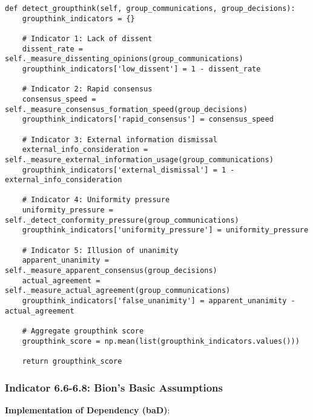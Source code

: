 \documentclass[11pt, onecolumn]{article}
\begin{document}
\begin{lstlisting}
def detect_groupthink(self, group_communications, group_decisions):
    groupthink_indicators = {}
    
    # Indicator 1: Lack of dissent
    dissent_rate = self._measure_dissenting_opinions(group_communications)
    groupthink_indicators['low_dissent'] = 1 - dissent_rate
    
    # Indicator 2: Rapid consensus
    consensus_speed = self._measure_consensus_formation_speed(group_decisions)
    groupthink_indicators['rapid_consensus'] = consensus_speed
    
    # Indicator 3: External information dismissal
    external_info_consideration = self._measure_external_information_usage(group_communications)
    groupthink_indicators['external_dismissal'] = 1 - external_info_consideration
    
    # Indicator 4: Uniformity pressure
    uniformity_pressure = self._detect_conformity_pressure(group_communications)
    groupthink_indicators['uniformity_pressure'] = uniformity_pressure
    
    # Indicator 5: Illusion of unanimity
    apparent_unanimity = self._measure_apparent_consensus(group_decisions)
    actual_agreement = self._measure_actual_agreement(group_communications)
    groupthink_indicators['false_unanimity'] = apparent_unanimity - actual_agreement
    
    # Aggregate groupthink score
    groupthink_score = np.mean(list(groupthink_indicators.values()))
    
    return groupthink_score
\end{lstlisting}

\subsubsection{Indicator 6.6-6.8: Bion's Basic Assumptions}

\textbf{Implementation of Dependency (baD)}:
\end{document}
